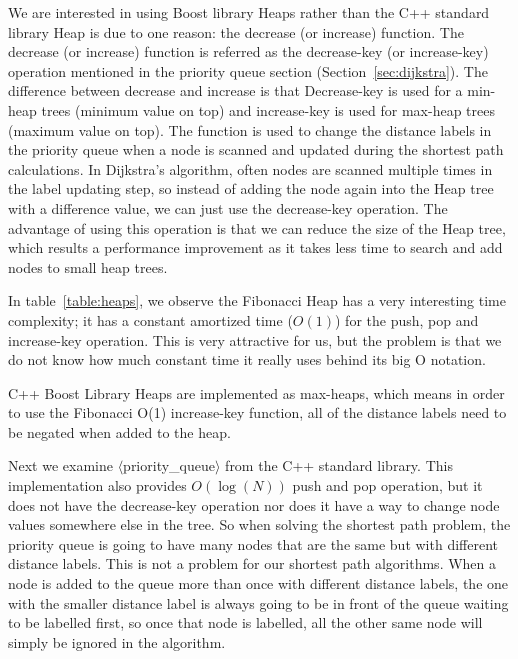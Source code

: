 We are interested in using Boost library Heaps rather than the C++ standard library Heap is due to one reason:
the decrease (or increase) function.
The decrease (or increase) function is referred as the decrease-key (or increase-key) operation mentioned in the priority queue section (Section~\ref{sec:dijkstra}).
The difference between decrease and increase is that Decrease-key is used for a min-heap trees (minimum value on top) and increase-key is used for max-heap trees (maximum value on top).
The function is used to change the distance labels in the priority queue when a node is scanned and updated during the shortest path calculations.
In Dijkstra's algorithm,
often nodes are scanned multiple times in the label updating step,
so instead of adding the node again into the Heap tree with a difference value,
we can just use the decrease-key operation.
The advantage of using this operation is that we can reduce the size of the Heap tree, which results a performance improvement as it takes less time to search and add nodes to small heap trees.

In table~\ref{table:heaps},
we observe the Fibonacci Heap has a very interesting time complexity;
it has a constant amortized time ($O(1)$) for the push, pop and increase-key operation.
This is very attractive for us, but the problem is that
we do not know how much constant time it really uses behind its big O notation.

C++ Boost Library Heaps are implemented as max-heaps,
which means in order to use the Fibonacci O(1) increase-key function,
all of the distance labels need to be negated when added to the heap.

Next we examine $\langle$priority\_queue$\rangle$ from the C++ standard library.
This implementation also provides $O(\log(N))$ push and pop operation,
but it does not have the decrease-key operation nor does it have a way to change node values somewhere else in the tree.
So when solving the shortest path problem,
the priority queue is going to have many nodes that are the same but with different distance labels.
This is not a problem for our shortest path algorithms.
When a node is added to the queue more than once with different distance labels,
the one with the smaller distance label is always going to be in front of the queue waiting to be labelled first,
so once that node is labelled,
all the other same node will simply be ignored in the algorithm.

